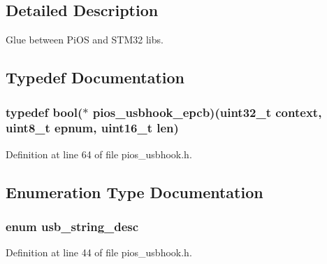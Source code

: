 \subsection{\-Detailed \-Description}
\-Glue between \-Pi\-O\-S and \-S\-T\-M32 libs. 

\subsection{\-Typedef \-Documentation}
\hypertarget{group___p_i_o_s___u_s_b_h_o_o_k_ga5f7904cd3922ab7207afebe3d9ef2650}{
\subsubsection[{pios\-\_\-usbhook\-\_\-epcb}]{\setlength{\rightskip}{0pt plus 5cm}typedef bool($\ast$ {\bf pios\-\_\-usbhook\-\_\-epcb})(uint32\-\_\-t context, uint8\-\_\-t epnum, uint16\-\_\-t len)}}\label{group___p_i_o_s___u_s_b_h_o_o_k_ga5f7904cd3922ab7207afebe3d9ef2650}


\-Definition at line 64 of file pios\-\_\-usbhook.\-h.



\subsection{\-Enumeration \-Type \-Documentation}
\hypertarget{group___p_i_o_s___u_s_b_h_o_o_k_ga5a1ae5206971f0c296fa30b24e8725da}{
\subsubsection[{usb\-\_\-string\-\_\-desc}]{\setlength{\rightskip}{0pt plus 5cm}enum {\bf usb\-\_\-string\-\_\-desc}}}\label{group___p_i_o_s___u_s_b_h_o_o_k_ga5a1ae5206971f0c296fa30b24e8725da}


\-Definition at line 44 of file pios\-\_\-usbhook.\-h.



